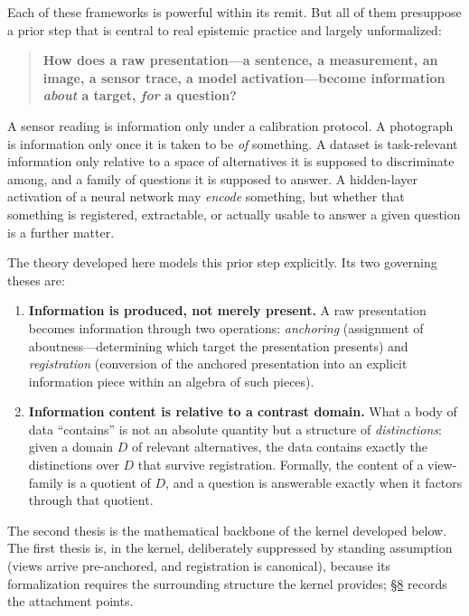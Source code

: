 Each of these frameworks is powerful within its remit. But all of them presuppose a prior step that is central to real epistemic practice and largely unformalized:

\begin{quote}
\textbf{How does a raw presentation---\hspace{0pt}a sentence, a measurement, an image, a sensor trace, a model activation---\hspace{0pt}become information \emph{about} a target, \emph{for} a question?}
\end{quote}

A sensor reading is information only under a calibration protocol. A photograph is information only once it is taken to be \emph{of} something. A dataset is task-relevant information only relative to a space of alternatives it is supposed to discriminate among, and a family of questions it is supposed to answer. A hidden-layer activation of a neural network may \emph{encode} something, but whether that something is registered, extractable, or actually usable to answer a given question is a further matter.

The theory developed here models this prior step explicitly. Its two governing theses are:

\begin{enumerate}
\def\labelenumi{\arabic{enumi}.}
\item
  \textbf{Information is produced, not merely present.} A raw presentation becomes information through two operations: \emph{anchoring} (assignment of aboutness---\hspace{0pt}determining which target the presentation presents) and \emph{registration} (conversion of the anchored presentation into an explicit information piece within an algebra of such pieces).
\item
  \textbf{Information content is relative to a contrast domain.} What a body of data ``contains'' is not an absolute quantity but a structure of \emph{distinctions}: given a domain \(D\) of relevant alternatives, the data contains exactly the distinctions over \(D\) that survive registration. Formally, the content of a view-family is a quotient of \(D\), and a question is answerable exactly when it factors through that quotient.
\end{enumerate}

The second thesis is the mathematical backbone of the kernel developed below. The first thesis is, in the kernel, deliberately suppressed by standing assumption (views arrive pre-anchored, and registration is canonical), because its formalization requires the surrounding structure the kernel provides; \hyperlink{sec:8}{§8} records the attachment points.

